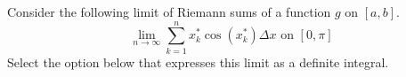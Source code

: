 \documentclass{ximera}
\author{Nela Lakos \and Kyle Parsons}
\begin{document}
\begin{exercise}

Consider the following limit of Riemann sums of a function $g$ on $[a,b]$.
\[
\lim_{n\to\infty}\sum_{k=1}^n x_k^*\cos(x_k^*)\Delta x \text{ on } [0,\pi]
\]
Select the option below that expresses this limit as a definite integral.

\begin{multipleChoice}
\end{multipleChoice}

\end{exercise}
\end{document}
